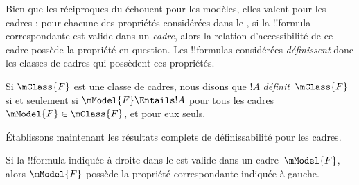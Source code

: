 \documentclass[../../../include/open-logic-section]{subfiles}
\begin{document}


Bien que les réciproques du 
échouent pour les modèles, elles valent pour les cadres :
pour chacune des propriétés considérées dans le
, si la !!{formula} correspondante
est valide dans un \emph{cadre}, alors la relation d'accessibilité
de ce cadre possède la propriété en question. Les !!{formula}s
considérées \emph{définissent} donc les classes de cadres qui
possèdent ces propriétés.

\begin{defn}
  Si $\mClass{F}$ est une classe de cadres, nous disons que
  $!A$ \emph{définit}~$\mClass{F}$ si et seulement si
  $\mModel{F} \Entails !A$ pour tous les cadres
  $\mModel{F} \in \mClass{F}$, et pour eux seuls.
\end{defn}

Établissons maintenant les résultats complets de
définissabilité pour les cadres.

\begin{thm}
Si la !!{formula} indiquée à droite dans le
 est valide dans un cadre~$\mModel{F}$,
alors $\mModel{F}$ possède la propriété correspondante
indiquée à gauche.
\end{thm}
\end{document}
